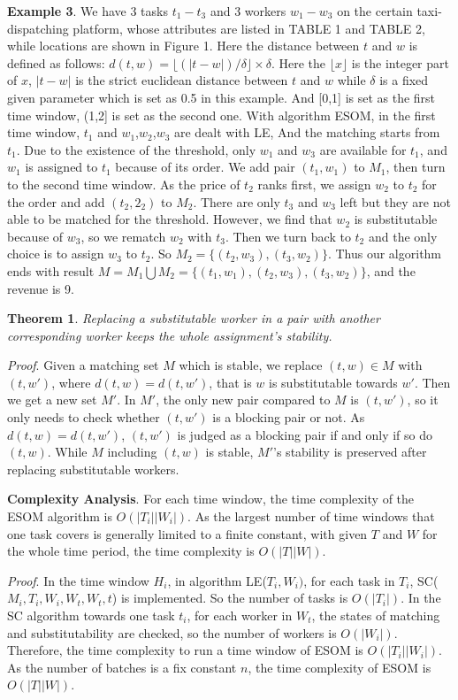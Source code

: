 \documentclass[color,twoside,amssymb,twocolumn]{article}
\begin{document}
\textbf{Example 3}. We have 3 tasks $t_1 - t_3$ and 3 workers $w_1-w_3$ on the certain taxi-dispatching platform, whose attributes are listed in TABLE 1 and TABLE 2, while locations are shown in Figure 1. Here the distance between $t$ and $w$ is defined as follows: $d(t,w)=\lfloor (|t-w|)/\delta \rfloor \times \delta$. Here the $\lfloor x \rfloor$ is the integer part of $x$, $|t-w|$ is the strict euclidean distance between $t$ and $w$ while $\delta$ is a fixed given parameter which is set as 0.5 in this example. And [0,1] is set as the first time window, (1,2] is set as the second one. With algorithm ESOM, in the first time window, {$t_1$} and {$w_1$,$w_2$,$w_3$} are dealt with LE, And the matching starts from $t_1$. Due to the existence of the threshold, only $w_1$ and $w_3$ are available for $t_1$, and $w_1$ is assigned to $t_1$ because of its order. We add pair $(t_1,w_1)$ to $M_1$, then turn to the second time window. As the price of $t_2$ ranks first, we assign $w_2$ to $t_2$ for the order and add $(t_2,2_2)$ to $M_2$. There are only $t_3$ and $w_3$ left but they are not able to be matched for the threshold. However, we find that $w_2$ is substitutable because of $w_3$, so we rematch $w_2$ with $t_3$. Then we turn back to $t_2$ and the only choice is to assign $w_3$ to $t_2$. So $M_2 = \{(t_2,w_3),(t_3,w_2)\}$. Thus our algorithm ends with result $M = M_1 \bigcup M_2 = \{(t_1,w_1),(t_2,w_3),(t_3,w_2)\}$, and the revenue is 9.

\textbf{Theorem 1}. {\it Replacing a substitutable worker in a pair with another corresponding worker keeps the whole assignment's stability.}

{\it Proof}. Given a matching set $M$ which is stable, we replace $(t,w) \in M$ with $(t,w')$, where $d(t,w) = d(t,w')$, that is $w$ is substitutable towards $w'$. Then we get a new set $M'$. In $M'$, the only new pair compared to $M$ is $(t,w')$, so it only needs to check whether $(t,w')$ is a blocking pair or not. As $d(t,w) = d(t,w')$, $(t,w')$ is judged as a blocking pair if and only if so do $(t,w)$. While $M$ including $(t,w)$ is stable, $M'$'s stability is preserved after replacing substitutable workers.

\textbf{Complexity Analysis}. For each time window, the time complexity of the ESOM algorithm is $O(|T_i||W_i|)$. As the largest number of time windows that one task covers is generally limited to a finite constant, with given $T$ and $W$ for the whole time period, the time complexity is $O(|T||W|)$.

{\it Proof}. In the time window $H_i$, in algorithm LE($T_i,W_i)$, for each task in $T_i$, SC($M_i,T_i,W_i,W_t,W_t,t$) is implemented. So the number of tasks is $O(|T_i|)$. In the SC algorithm towards one task $t_i$, for each worker in $W_t$, the states of matching and substitutability are checked, so the number of workers is $O(|W_i|)$. Therefore, the time complexity to run a time window of ESOM is $O(|T_i||W_i|)$. As the number of batches is a fix constant $n$, the time complexity of ESOM is $O(|T||W|)$.
\end{document}
